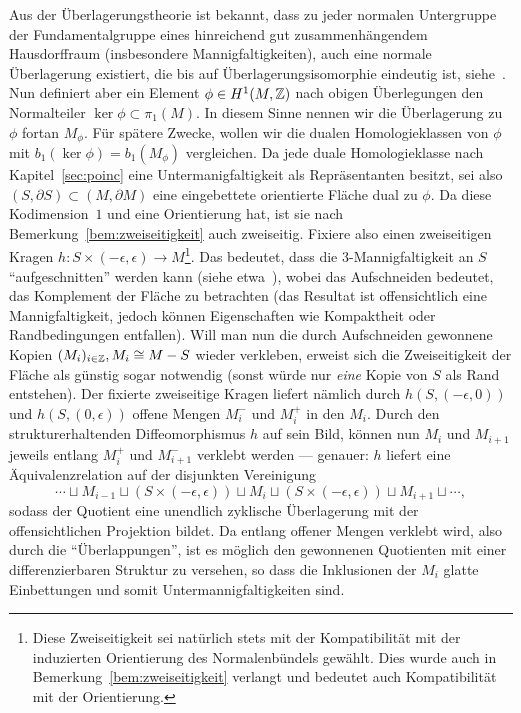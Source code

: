 \begin{constr}
	\label{constr:cut}
	Aus der Überlagerungstheorie ist bekannt, dass zu jeder normalen Untergruppe der Fundamentalgruppe eines hinreichend gut zusammenhängendem Hausdorffraum (insbesondere Mannigfaltigkeiten), auch eine normale Überlagerung existiert, die bis auf Überlagerungsisomorphie eindeutig ist, siehe~\cite[Chapter~1.3]{Hatcher.2002}. Nun definiert aber ein Element $\phi\in H^1(M,\mathbb{Z})$ nach obigen Überlegungen den Normalteiler $\ker\phi\subset \pi_1(M)$. In diesem Sinne nennen wir die Überlagerung zu $\phi$ fortan $M_\phi$. Für spätere Zwecke, wollen wir die dualen Homologieklassen von $\phi$ mit $b_1(\ker\phi)=b_1(M_\phi)$ vergleichen. Da jede duale Homologieklasse nach Kapitel~\ref{sec:poinc} eine Untermanigfaltigkeit als Repräsentanten besitzt, sei also $(S,\partial S) \subset (M,\partial M)$ eine eingebettete orientierte Fläche dual zu $\phi$. Da diese Kodimension~$1$ und eine Orientierung hat, ist sie nach Bemerkung~\ref{bem:zweiseitigkeit} auch zweiseitig. Fixiere also einen zweiseitigen Kragen $h:S\times (-\epsilon,\epsilon) \to M$\footnote{Diese Zweiseitigkeit sei natürlich stets mit der Kompatibilität mit der induzierten Orientierung des Normalenbündels gewählt. Dies wurde auch in Bemerkung~\ref{bem:zweiseitigkeit} verlangt und bedeutet auch Kompatibilität mit der Orientierung.}. Das bedeutet, dass die 3-Mannigfaltigkeit an $S$ "`aufgeschnitten"' werden kann (siehe etwa~\cite[Kapitel~4.2]{Burde.2003}), wobei das Aufschneiden bedeutet, das Komplement der Fläche zu betrachten (das Resultat ist offensichtlich eine Mannigfaltigkeit, jedoch können Eigenschaften wie Kompaktheit oder Randbedingungen entfallen). Will man nun die durch Aufschneiden gewonnene Kopien $(M_i)_{i\in \mathbb{Z}}, M_i \cong M-S$ wieder verkleben, erweist sich die Zweiseitigkeit der Fläche als günstig sogar notwendig (sonst würde nur \emph{eine} Kopie von $S$ als Rand entstehen). Der fixierte zweiseitige Kragen liefert nämlich durch $h(S,(-\epsilon,0))$ und $h(S,(0,\epsilon))$ offene Mengen $M_i^-$ und $M_i^+$ in den $M_i$. Durch den strukturerhaltenden Diffeomorphismus $h$ auf sein Bild, können nun $M_i$ und $M_{i+1}$ jeweils entlang $M_i^+$ und $M_{i+1}^-$ verklebt werden --- genauer: $h$ liefert eine Äquivalenzrelation auf der disjunkten Vereinigung 
	\[
		\cdots \sqcup M_{i-1} \sqcup (S \times (-\epsilon,\epsilon)) \sqcup M_i \sqcup  (S \times (-\epsilon,\epsilon)) \sqcup M_{i+1} \sqcup \cdots,
	\]
	sodass der Quotient eine unendlich zyklische Überlagerung mit der offensichtlichen Projektion bildet. Da entlang offener Mengen verklebt wird, also durch die "`Überlappungen"', ist es möglich den gewonnenen Quotienten mit einer differenzierbaren Struktur zu versehen, so dass die Inklusionen der $M_i$ glatte Einbettungen und somit Untermannigfaltigkeiten sind.


\end{constr}

